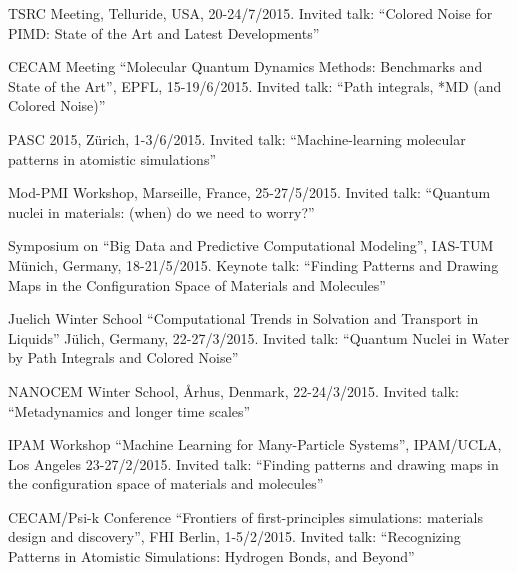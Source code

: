 \begin{enumerate}
{\item TSRC Meeting, Telluride, USA, 20-24/7/2015. Invited talk: “Colored Noise for PIMD: State of the Art and Latest Developments”
\item CECAM Meeting “Molecular Quantum Dynamics Methods: Benchmarks and State of the Art”, EPFL, 15-19/6/2015. Invited talk: “Path integrals, *MD (and Colored Noise)”
\item PASC 2015, Zürich, 1-3/6/2015. Invited talk: “Machine-learning molecular patterns in atomistic simulations”
\item Mod-PMI Workshop, Marseille, France, 25-27/5/2015. Invited talk: “Quantum nuclei in materials: (when) do we need to worry?”
\item Symposium on “Big Data and Predictive Computational Modeling”, IAS-TUM Münich, Germany, 18-21/5/2015. Keynote talk: “Finding Patterns and Drawing Maps in the Configuration Space of Materials and Molecules”
\item Juelich Winter School “Computational Trends in Solvation and Transport in Liquids” Jülich, Germany, 22-27/3/2015. Invited talk: “Quantum Nuclei in Water by Path Integrals and Colored Noise”
\item NANOCEM Winter School, Århus, Denmark, 22-24/3/2015. Invited talk: “Metadynamics and longer time scales”
\item IPAM Workshop “Machine Learning for Many-Particle Systems”, IPAM/UCLA, Los Angeles 23-27/2/2015. Invited talk: “Finding patterns and drawing maps in the configuration space of materials and molecules”
\item CECAM/Psi-k Conference “Frontiers of first-principles simulations: materials design and discovery”, FHI Berlin, 1-5/2/2015. Invited talk: “Recognizing Patterns in Atomistic Simulations: Hydrogen Bonds, and Beyond”
}
\end{enumerate}
